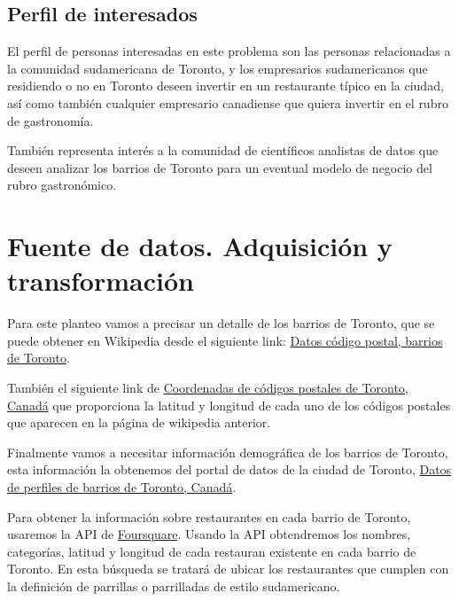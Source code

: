 \documentclass[11pt,a4paper,sans, spanish]{article}
\begin{document}
\subsection{Perfil de interesados}
El perfil de personas interesadas en este problema son las personas relacionadas a la comunidad sudamericana de Toronto, y los empresarios sudamericanos que residiendo o no en Toronto deseen invertir en un restaurante típico en la ciudad, así como también cualquier empresario canadiense que quiera invertir en el rubro de gastronomía.

También representa interés a  la comunidad de científicos analistas de datos que deseen analizar los barrios de Toronto para un eventual modelo de negocio del rubro gastronómico.

\section{Fuente de datos. Adquisición y transformación}
Para este planteo vamos a precisar un detalle de los barrios de Toronto, que se puede obtener en Wikipedia desde el siguiente link: {\href{https://en.wikipedia.org/wiki/List_of_postal_codes_of_Canada:_M}{Datos código postal, barrios de Toronto}}.

También el siguiente link de {\href{https://cocl.us/Geospatial_data\%E2\%80\%9D}{Coordenadas de códigos postales de Toronto, Canadá}} que proporciona la latitud y longitud de cada uno de los códigos postales que aparecen en la página de wikipedia anterior.

Finalmente vamos a necesitar información demográfica de los barrios de Toronto, esta información la obtenemos del portal de datos de la ciudad de Toronto, {\href{https://open.toronto.ca/dataset/neighbourhood-profiles/}{Datos de perfiles de barrios de Toronto, Canadá}}.

Para obtener la información sobre restaurantes en cada barrio de Toronto, usaremos la API de  {\href{https://developer.foursquare.com/docs}{Foursquare}}. Usando la API obtendremos los nombres, categorías, latitud y longitud de cada restauran existente en cada barrio de Toronto. En esta búsqueda se tratará de ubicar los restaurantes que cumplen con la definición de parrillas o parrilladas de estilo sudamericano.   
\end{document}
